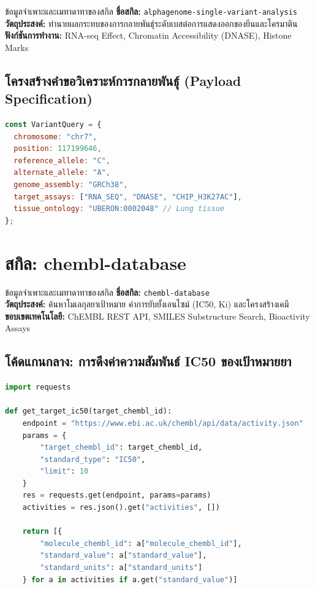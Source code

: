 \begin{teachingplan}{ข้อมูลจำเพาะและเมทาดาทาของสกิล}
\textbf{ชื่อสกิล:} \texttt{alphagenome-single-variant-analysis}\\
\textbf{วัตถุประสงค์:} ทำนายผลกระทบของการกลายพันธุ์ระดับเบสต่อการแสดงออกของยีนและโครมาติน\\
\textbf{ฟังก์ชันการทำงาน:} RNA-seq Effect, Chromatin Accessibility (DNASE), Histone Marks
\end{teachingplan}

\subsection{โครงสร้างคำขอวิเคราะห์การกลายพันธุ์ (Payload Specification)}

\begin{lstlisting}[language=JavaScript, caption={AlphaGenome Variant Query Payload}]
const VariantQuery = {
  chromosome: "chr7",
  position: 117199646,
  reference_allele: "C",
  alternate_allele: "A",
  genome_assembly: "GRCh38",
  target_assays: ["RNA_SEQ", "DNASE", "CHIP_H3K27AC"],
  tissue_ontology: "UBERON:0002048" // Lung tissue
};
\end{lstlisting}

\section{สกิล: chembl-database}

\begin{teachingplan}{ข้อมูลจำเพาะและเมทาดาทาของสกิล}
\textbf{ชื่อสกิล:} \texttt{chembl-database}\\
\textbf{วัตถุประสงค์:} ค้นหาโมเลกุลยาเป้าหมาย ค่าการยับยั้งเอนไซม์ (IC50, Ki) และโครงสร้างเคมี\\
\textbf{ขอบเขตเทคโนโลยี:} ChEMBL REST API, SMILES Substructure Search, Bioactivity Assays
\end{teachingplan}

\subsection{โค้ดแกนกลาง: การดึงค่าความสัมพันธ์ IC50 ของเป้าหมายยา}

\begin{lstlisting}[language=Python, caption={ChEMBL Bioactivity Query Script}]
import requests

def get_target_ic50(target_chembl_id):
    endpoint = "https://www.ebi.ac.uk/chembl/api/data/activity.json"
    params = {
        "target_chembl_id": target_chembl_id,
        "standard_type": "IC50",
        "limit": 10
    }
    res = requests.get(endpoint, params=params)
    activities = res.json().get("activities", [])
    
    return [{
        "molecule_chembl_id": a["molecule_chembl_id"],
        "standard_value": a["standard_value"],
        "standard_units": a["standard_units"]
    } for a in activities if a.get("standard_value")]
\end{lstlisting}


